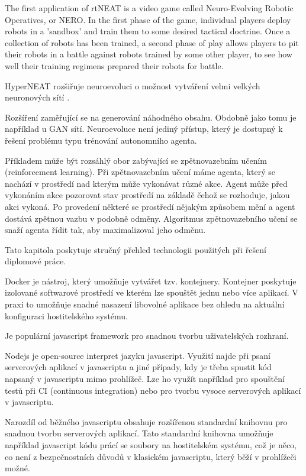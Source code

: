 The first application of rtNEAT is a video game called Neuro-Evolving Robotic Operatives, or NERO. In the first phase of the game, individual players deploy robots in a 'sandbox' and train them to some desired tactical doctrine. Once a collection of robots has been trained, a second phase of play allows players to pit their robots in a battle against robots trained by some other player, to see how well their training regimens prepared their robots for battle.

HyperNEAT rozšiřuje neuroevoluci o možnost vytváření velmi velkých neuronových sítí \cite[s.~1]{hyperNEAT}.

Rozšíření zaměřující se na generování náhodného obsahu. Obdobně jako tomu je například u GAN sítí.
Neuroevoluce není jediný přístup, který je dostupný k řešení problému typu trénování autonomního agenta.

Příkladem může být rozsáhlý obor zabývající se zpětnovazebním učením (reinforcement learning). Při zpětnovazebním učení máme agenta, který se nachází v prostředí nad kterým může vykonávat různé akce. Agent může před vykonáním akce pozorovat stav prostředí na základě čehož se rozhoduje, jakou akci vykoná. Po provedení některé se prostředí nějakým způsobem mění a agent dostává zpětnou vazbu v podobně odměny. Algoritmus zpětnovazebního učení se snaží agenta řídit tak, aby maximalizoval jeho odměnu. 

Tato kapitola poskytuje stručný přehled technologii použitých při řešení diplomové práce.

Docker je nástroj, který umožňuje vytvářet tzv. kontejnery. Kontejner poskytuje izolované softwarové prostředí ve kterém lze spouštět jednu nebo více aplikací. 
V praxi to umožňuje snadné nasazení libovolné aplikace bez ohledu na aktuální konfiguraci hostitelského systému.

Je populární javascript framework pro snadnou tvorbu uživatelských rozhraní.

Nodejs je open-source interpret jazyku javascript. Využití najde při psaní serverových aplikací v javascriptu a jiné případy, kdy je třeba spustit kód napsaný v javascriptu mimo prohlížeč. Lze ho využít například pro spouštění testů při CI (continuous integration) nebo pro tvorbu vysoce serverových aplikací v javascriptu.

Narozdíl od běžného javascriptu obsahuje rozšířenou standardní knihovnu pro snadnou tvorbu serverových aplikací. Tato standardní knihovna umožňuje například javascript kódu prácí se soubory na hostitelském systému, což je něco, co není z bezpečnostních důvodů v klasickém javascriptu, který běží v prohlížeči možné.

